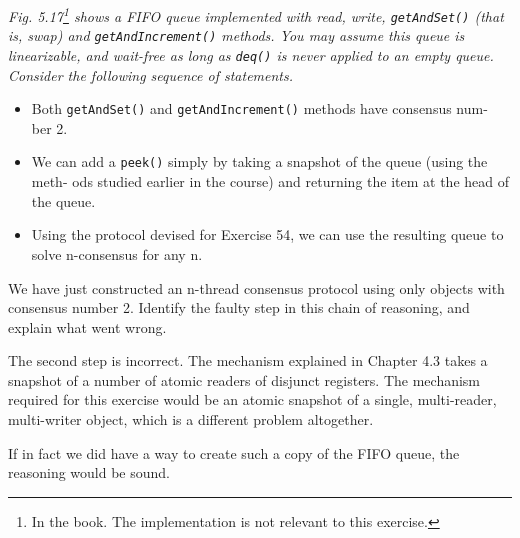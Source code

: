 \documentclass[a4paper,10pt]{article}
\begin{document}
{\itshape Fig. 5.17\footnote{In the book. The implementation is not relevant to this exercise.}
shows a FIFO queue implemented with read, write,
\lstinline|getAndSet()| (that is, swap) and \lstinline|getAndIncrement()| methods. You may assume this queue is linearizable, and wait-free as long as \lstinline|deq()| is never applied to an
empty queue. Consider the following sequence of statements.

\begin{itemize}
\item Both \lstinline|getAndSet()| and \lstinline|getAndIncrement()| methods have consensus num-
ber 2.
\item We can add a \lstinline|peek()| simply by taking a snapshot of the queue (using the meth-
ods studied earlier in the course) and returning the item at the head of the
queue.
\item Using the protocol devised for Exercise 54, we can use the resulting queue to
solve n-consensus for any n.
\end{itemize}

We have just constructed an n-thread consensus protocol using only objects with
consensus number 2. Identify the faulty step in this chain of reasoning, and
explain what went wrong.}

\vspace{3mm}

The second step is incorrect. The mechanism explained in Chapter 4.3 takes a snapshot
of a number of atomic readers of disjunct registers. The mechanism required for this
exercise would be an atomic snapshot of a single, multi-reader, multi-writer object, which
is a different problem altogether.

If in fact we did have a way to create such a copy of the FIFO queue, the reasoning would be sound.

\begin{comment}

Exercise 51: p139

\subsection{Exercise }

\emph{}

\vspace{3mm}

\vspace{3mm}

\begin{align}
S(p) &= \frac{s}{s'} = \frac{2s(p - 1)}{s(p - 1) - 1} \\
     &= \frac{2 \cdot \frac{3}{10} \cdot (p - 1)}{\frac{3}{10} \cdot (p - 1) - 1} 
\end{align}

\begin{figure}
\begin{lstlisting}

\end{lstlisting}
\caption{The Flaky lock used in Exercise 11.}
\label{fig:flaky}
\end{figure}

\end{comment}
\end{document}
